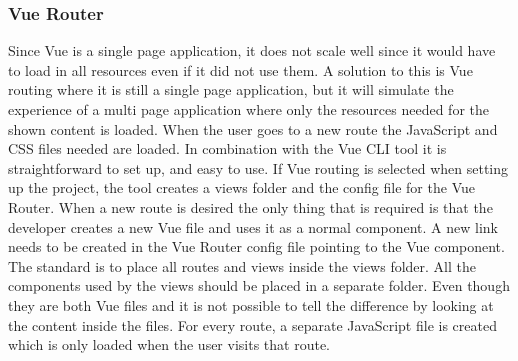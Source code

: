 \subsubsection{Vue Router}
Since Vue is a single page application, it does not scale well since it would have to load in all resources even if it did not use them. A solution to this is Vue routing where it is still a single page application, but it will simulate the experience of a multi page application where only the resources needed for the shown content is loaded. When the user goes to a new route the JavaScript and CSS files needed are loaded. In combination with the Vue CLI tool it is straightforward to set up, and easy to use. If Vue routing is selected when setting up the project, the tool creates a views folder and the config file for the Vue Router. When a new route is desired the only thing that is required is that the developer creates a new Vue file and uses it as a normal component. A new link needs to be created in the Vue Router config file pointing to the Vue component. The standard is to place all routes and views inside the views folder. All the components used by the views should be placed in a separate folder. Even though they are both Vue files and it is not possible to tell the difference by looking at the content inside the files.
For every route, a separate JavaScript file is created which is only loaded when the user visits that route.
